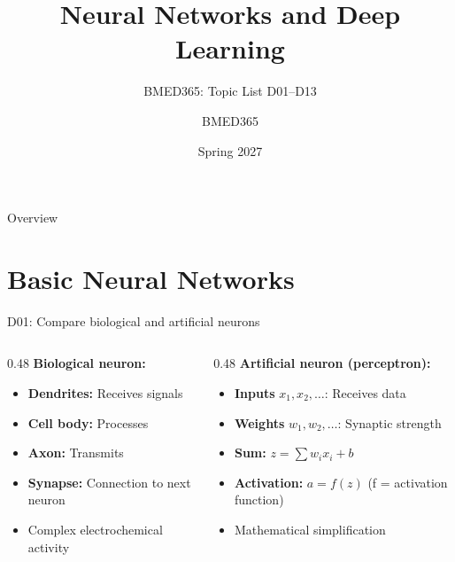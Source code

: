 \documentclass[aspectratio=169, 10pt]{beamer}
\title{Neural Networks and Deep Learning}
\subtitle{BMED365: Topic List D01--D13}
\author{BMED365}
\date{Spring 2027}
\begin{document}
\begin{frame}
    \titlepage
\end{frame}

\begin{frame}{Overview}
    \tableofcontents
\end{frame}

\section{Basic Neural Networks}

\begin{frame}{D01: Compare biological and artificial neurons}
    \begin{columns}[T]
        \begin{column}{0.48\textwidth}
            \textbf{Biological neuron:}
            \begin{itemize}
                \item \textbf{Dendrites:} Receives signals
                \item \textbf{Cell body:} Processes
                \item \textbf{Axon:} Transmits
                \item \textbf{Synapse:} Connection to next neuron
                \item Complex electrochemical activity
            \end{itemize}
        \end{column}
        \begin{column}{0.48\textwidth}
            \textbf{Artificial neuron (perceptron):}
            \begin{itemize}
                \item \textbf{Inputs} $x_1, x_2, \ldots$: Receives data
                \item \textbf{Weights} $w_1, w_2, \ldots$: Synaptic strength
                \item \textbf{Sum:} $z = \sum w_i x_i + b$
                \item \textbf{Activation:} $a = f(z)$ \small(f = activation function)
                \item Mathematical simplification
            \end{itemize}
        \end{column}
    \end{columns}
    

\end{frame}
\end{document}
